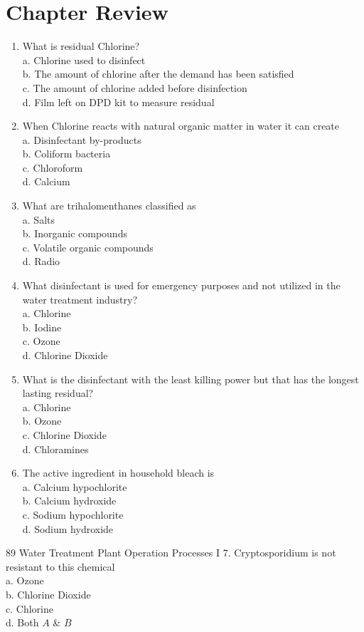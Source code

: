 \documentclass[10pt]{article}
\begin{document}
\section{Chapter Review}
\begin{enumerate}
  \item What is residual Chlorine?\\
a. Chlorine used to disinfect\\
b. The amount of chlorine after the demand has been satisfied\\
c. The amount of chlorine added before disinfection\\
d. Film left on DPD kit to measure residual

  \item When Chlorine reacts with natural organic matter in water it can create\\
a. Disinfectant by-products\\
b. Coliform bacteria\\
c. Chloroform\\
d. Calcium

  \item What are trihalomenthanes classified as\\
a. Salts\\
b. Inorganic compounds\\
c. Volatile organic compounds\\
d. Radio

  \item What disinfectant is used for emergency purposes and not utilized in the water treatment industry?\\
a. Chlorine\\
b. Iodine\\
c. Ozone\\
d. Chlorine Dioxide

  \item What is the disinfectant with the least killing power but that has the longest lasting residual?\\
a. Chlorine\\
b. Ozone\\
c. Chlorine Dioxide\\
d. Chloramines

  \item The active ingredient in household bleach is\\
a. Calcium hypochlorite\\
b. Calcium hydroxide\\
c. Sodium hypochlorite\\
d. Sodium hydroxide

\end{enumerate}
89 Water Treatment Plant Operation Processes I 7. Cryptosporidium is not resistant to this chemical\\
a. Ozone\\
b. Chlorine Dioxide\\
c. Chlorine\\
d. Both $A$ \& $B$
\end{document}
